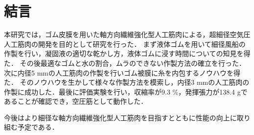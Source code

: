 \newpage
\section{結言}

本研究では，ゴム皮膜を用いた軸方向繊維強化型人工筋肉による，超細径空気圧人工筋肉の開発を目的として研究を行った．
まず液体ゴムを用いて細径風船の作製を行い，凝固液の適切な乾かし方，液体ゴムに浸す時間についての知見を得た．
その後最適なゴムと水の割合，ムラのできない作製方法の確立を行った．次に内径5 mmの人工筋肉の作製を行いゴム被膜に糸を内包するノウハウを得た．
そのノウハウを生かして様々な作製方法を模索し，内径3 mmの人工筋肉の作製に成功した．最後に評価実験を行い，収縮率が9.3 \%，発揮張力が138.4 gであることが確認でき，空圧筋として動作した．
\noindent

今後はより細径な軸方向繊維強化型人工筋肉を目指すとともに性能の向上に取り組む予定である．
